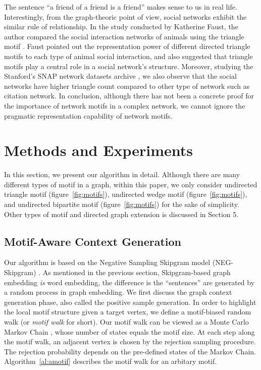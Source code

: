 \documentclass[letterpaper]{article}
\begin{document}
            The sentence ``a friend of a friend is a friend'' makes sense to us in real life. Interestingly,
            from the graph-theoric point of view, social networks exhibit the similar rule of relationship.
            In the study conducted by Katherine Faust, the author compared the social interaction 
            networks of animals using the triangle motif \cite{comsocialnetwork}. Faust pointed
            out the representation power of different directed triangle motifs to each type of animal social
            interaction, and also suggested that triangle motifs play a central role in a social network's
            structure. Moreover, studying the Stanford's SNAP network datasets archive \cite{SNAP}, 
            we also observe that the social networks have higher triangle count compared to other type of 
            network such as citation network. In conclusion, although there has not been a concrete proof 
            for the importance of network motifs in a complex network, we cannot ignore the pragmatic 
            representation capability of network motifs.

    \section{Methods and Experiments}

        In this section, we present our algorithm in detail. Although there are many different types of motif
        in a graph, within this paper, we only consider undirected triangle motif (figure~\ref{fig:motifs}),
        undirected wedge motif (figure~\ref{fig:motifs}), and undirected bipartite motif 
        (figure~\ref{fig:motifs}) for the sake of simplicity. Other types of motif and directed graph
        extension is discussed in Section 5.

        \subsection{Motif-Aware Context Generation}

            Our algorithm is based on the Negative Sampling Skipgram model (NEG-Skipgram) \cite{skipgram}.
            As mentioned in the previous section, Skipgram-based graph embedding \emph{is} word embedding,
            the difference is the ``sentences'' are generated by a random process in graph embedding.
            We first discuss the graph context generation phase, also called the positive sample generation.
            In order to highlight the local motif structure given a target vertex, we define a motif-biased
            random walk (or \emph{motif walk} for short). Our motif walk can be viewed as a Monte Carlo
            Markov Chain \cite{mcmc}, whose number of states equals the motif size. At each step along 
            the motif walk, an adjacent vertex is chosen by the rejection sampling procedure. The rejection
            probability depends on the pre-defined states of the Markov Chain. Algorithm~\ref{al:amotif} 
            describes the motif walk for an arbitary motif.
\end{document}
